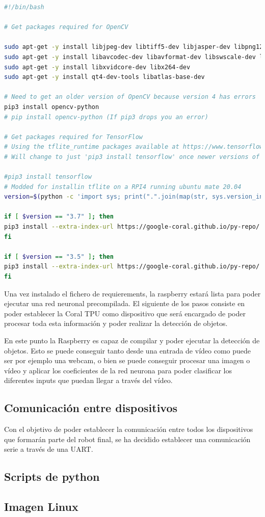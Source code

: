 \begin{lstlisting}[language=bash, caption={Código bash}, label={cod:bash}, captionpos=b]
#!/bin/bash

# Get packages required for OpenCV

sudo apt-get -y install libjpeg-dev libtiff5-dev libjasper-dev libpng12-dev
sudo apt-get -y install libavcodec-dev libavformat-dev libswscale-dev libv4l-dev
sudo apt-get -y install libxvidcore-dev libx264-dev
sudo apt-get -y install qt4-dev-tools libatlas-base-dev

# Need to get an older version of OpenCV because version 4 has errors
pip3 install opencv-python
# pip install opencv-python (If pip3 drops you an error)

# Get packages required for TensorFlow
# Using the tflite_runtime packages available at https://www.tensorflow.org/lite/guide/python
# Will change to just 'pip3 install tensorflow' once newer versions of TF are added to piwheels

#pip3 install tensorflow
# Modded for installin tflite on a RPI4 running ubuntu mate 20.04
version=$(python -c 'import sys; print(".".join(map(str, sys.version_info[:2])))')

if [ $version == "3.7" ]; then
pip3 install --extra-index-url https://google-coral.github.io/py-repo/ tflite_runtime
fi

if [ $version == "3.5" ]; then
pip3 install --extra-index-url https://google-coral.github.io/py-repo/ tflite_runtime
fi
\end{lstlisting}

Una vez instalado el fichero de requierements, la raspberry estará lista para poder ejecutar una red neuronal precompilada. El siguiente de los pasos consiste en poder establecer la Coral TPU como dispositivo que será encargado de poder procesar toda esta información y poder realizar la detección de objetos.

En este punto la Raspberry es capaz de compilar y poder ejecutar la detección de objetos. Esto se puede conseguir tanto desde una entrada de vídeo como puede ser por ejemplo una webcam, o bien se puede conseguir procesar una imagen o vídeo y aplicar los coeficientes de la red neurona para poder clasificar los diferentes inputs que puedan llegar a través del vídeo. 


\subsection{Comunicación entre dispositivos}

Con el objetivo de poder establecer la comunicación entre todos los dispositivos que formarán parte del robot final, se ha decidido establecer una comunicación serie a través de una UART. 


\subsection{Scripts de python}

\subsection{Imagen Linux}